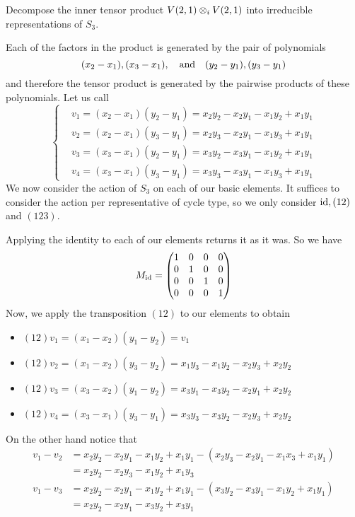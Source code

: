 \documentclass[12pt]{memoir}
\begin{document}
\begin{Ej}[Exercise 5]
    Decompose the inner tensor product $V(2,1)\otimes_i V(2,1)$ into irreducible representations of $S_3$.
\end{Ej}

\begin{ptcbr}
Each of the factors in the product is generated by the pair of polynomials 
$$(x_2-x_1),(x_3-x_1),\quad\text{and}\quad(y_2-y_1),(y_3-y_1)$$
and therefore the tensor product is generated by the pairwise products of these polynomials. Let us call 
$$
\left\lbrace
\begin{aligned}
    &v_1=(x_2-x_1)(y_2-y_1)=x_2y_2-x_2y_1-x_1y_2+x_1y_1\\
    &v_2=(x_2-x_1)(y_3-y_1)=x_2y_3-x_2y_1-x_1y_3+x_1y_1\\
    &v_3=(x_3-x_1)(y_2-y_1)=x_3y_2-x_3y_1-x_1y_2+x_1y_1\\
    &v_4=(x_3-x_1)(y_3-y_1)=x_3y_3-x_3y_1-x_1y_3+x_1y_1
\end{aligned}
\right.
$$
We now consider the action of $S_3$ on each of our basic elements. It suffices to consider the action per representative of cycle type, so we only consider $\operatorname{id},(12)$ and $(123)$.\par 
Applying the identity to each of our elements returns it as it was. So we have 
$$M_{\operatorname{id}}=\begin{pmatrix}
    1&0&0&0\\0&1&0&0\\0&0&1&0\\0&0&0&1
\end{pmatrix}$$
Now, we apply the transposition $(12)$ to our elements to obtain 
\begin{itemize}
    \item $(12)v_1=(x_1-x_2)(y_1-y_2)=v_1$
    \item $(12)v_2=(x_1-x_2)(y_3-y_2)=x_1y_3-x_1y_2-x_2y_3+x_2y_2$
    \item $(12)v_3=(x_3-x_2)(y_1-y_2)=x_3y_1-x_3y_2-x_2y_1+x_2y_2$
    \item $(12)v_4=(x_3-x_1)(y_3-y_1)=x_3y_3-x_3y_2-x_2y_3+x_2y_2$
\end{itemize}
On the other hand notice that 
\begin{align*}
    v_1-v_2&=x_2y_2-x_2y_1-x_1y_2+x_1y_1-(x_2y_3-x_2y_1-x_1x_3+x_1y_1)\\
    &=x_2y_2-x_2y_3-x_1y_2+x_1y_3\\
    v_1-v_3&=x_2y_2-x_2y_1-x_1y_2+x_1y_1-(x_3y_2-x_3y_1-x_1y_2+x_1y_1)\\
    &=x_2y_2-x_2y_1-x_3y_2+x_3y_1\\

\end{align*}
\end{ptcbr}
\end{document}
